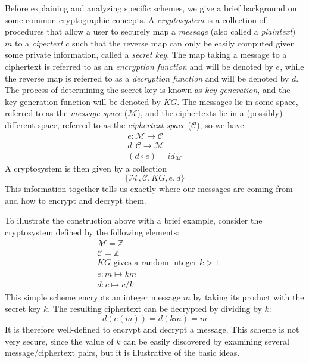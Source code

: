 \documentclass[11pt]{report}
\newcommand{\Z}{\mathbb{Z}}
\newcommand{\M}{\mathcal{M}}
\newcommand{\lra}{\longrightarrow}
\begin{document}
Before explaining and analyzing specific schemes, we give a brief background on some common cryptographic concepts. A \emph{cryptosystem} is a collection of procedures that allow a user to securely map a \emph{message} (also called a \emph{plaintext}) $m$ to a \emph{cipertext} $c$ such that the reverse map can only be easily computed given some private information, called a \emph{secret key}. The map taking a message to a ciphertext is referred to as an \emph{encryption function} and will be denoted by $e$, while the reverse map is referred to as a \emph{decryption function} and will be denoted by $d$. The process of determining the secret key is known as \emph{key generation}, and the key generation function will be denoted by $KG$. The messages lie in some space, referred to as the \emph{message space} ($\M$), and the ciphertexts lie in a (possibly) different space, referred to as the \emph{ciphertext space} ($\mathcal{C}$), so we have
\begin{align*}
e: \M \lra \mathcal{C} \\
d: \mathcal{C} \lra \M \\
(d\circ e) = id_{\M}
\end{align*}
A cryptosystem is then given by a collection \[\{\M, \mathcal{C},  KG, e, d\}\] This information together tells us exactly where our messages are coming from and how to encrypt and decrypt them.

\label{Example1}To illustrate the construction above with a brief example, consider the cryptosystem defined by the following elements:
\begin{align*}
&\M = \Z \\
&\mathcal{C} = \Z \\
&KG \text{ gives a random integer } k>1 \\
&e: m \mapsto km \\
&d: c \mapsto c/k
\end{align*}
\noindent This simple scheme encrypts an integer message $m$ by taking its product with the secret key $k$. The resulting ciphertext can be decrypted by dividing by $k$: \[d(e(m)) = d(km) = m\] It is therefore well-defined to encrypt and decrypt a message. This scheme is not very secure, since the value of $k$ can be easily discovered by examining several message/ciphertext pairs, but it is illustrative of the basic ideas.
\end{document}
